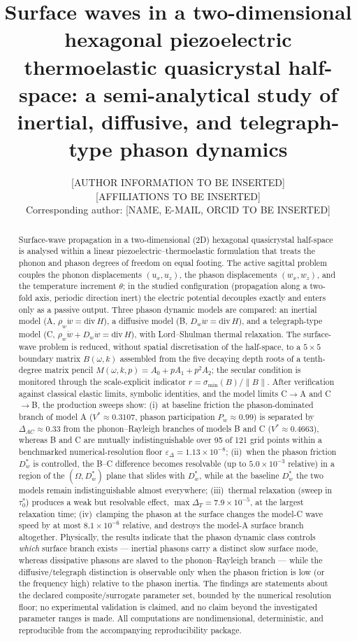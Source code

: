\documentclass[11pt]{article}
\title{\bf Surface waves in a two-dimensional hexagonal piezoelectric thermoelastic quasicrystal half-space: a semi-analytical study of inertial, diffusive, and telegraph-type phason dynamics}
\author{[AUTHOR INFORMATION TO BE INSERTED]\\
\small [AFFILIATIONS TO BE INSERTED]\\
\small Corresponding author: [NAME, E-MAIL, ORCID TO BE INSERTED]}
\date{}
\newcommand{\e}{\varepsilon}
\newcommand{\om}{\omega}
\newcommand{\Om}{\Omega}
\newcommand{\tht}{\theta}
\newcommand{\Dw}{D_w}
\newcommand{\rw}{\rho_w}
\begin{document}
\maketitle

\begin{abstract}
\noindent Surface-wave propagation in a two-dimensional (2D) hexagonal quasicrystal half-space is analysed within a linear piezoelectric--thermoelastic formulation that treats the phonon and phason degrees of freedom on equal footing. The active sagittal problem couples the phonon displacements $(u_x,u_z)$, the phason displacements $(w_x,w_z)$, and the temperature increment $\tht$; in the studied configuration (propagation along a two-fold axis, periodic direction inert) the electric potential decouples exactly and enters only as a passive output. Three phason dynamic models are compared: an inertial model (A, $\rw\ddot w=\mathrm{div}\,H$), a diffusive model (B, $\Dw\dot w=\mathrm{div}\,H$), and a telegraph-type model (C, $\rw\ddot w+\Dw\dot w=\mathrm{div}\,H$), with Lord--Shulman thermal relaxation. The surface-wave problem is reduced, without spatial discretisation of the half-space, to a $5\times5$ boundary matrix $B(\om,k)$ assembled from the five decaying depth roots of a tenth-degree matrix pencil $M(\om,k,p)=A_0+pA_1+p^2A_2$; the secular condition is monitored through the scale-explicit indicator $r=\sigma_{\min}(B)/\lVert B\rVert$. After verification against classical elastic limits, symbolic identities, and the model limits C$\to$A and C$\to$B, the production sweeps show: (i)~at baseline friction the phason-dominated branch of model A ($V^*\approx0.3107$, phason participation $P_w\approx0.99$) is separated by $\Delta_{AC}\approx0.33$ from the phonon--Rayleigh branches of models B and C ($V^*\approx0.4663$), whereas B and C are mutually indistinguishable over 95 of 121 grid points within a benchmarked numerical-resolution floor $\e_\Delta=1.13\times10^{-8}$; (ii)~when the phason friction $D_w^*$ is controlled, the B--C difference becomes resolvable (up to $5.0\times10^{-3}$ relative) in a region of the $(\Om,D_w^*)$ plane that slides with $D_w^*$, while at the baseline $D_w^*$ the two models remain indistinguishable almost everywhere; (iii)~thermal relaxation (sweep in $\tau_0^*$) produces a weak but resolvable effect, $\max\Delta_T=7.9\times10^{-5}$, at the largest relaxation time; (iv)~clamping the phason at the surface changes the model-C wave speed by at most $8.1\times10^{-6}$ relative, and destroys the model-A surface branch altogether. Physically, the results indicate that the phason dynamic class controls \emph{which} surface branch exists --- inertial phasons carry a distinct slow surface mode, whereas dissipative phasons are slaved to the phonon--Rayleigh branch --- while the diffusive/telegraph distinction is observable only when the phason friction is low (or the frequency high) relative to the phason inertia. The findings are statements about the declared composite/surrogate parameter set, bounded by the numerical resolution floor; no experimental validation is claimed, and no claim beyond the investigated parameter ranges is made. All computations are nondimensional, deterministic, and reproducible from the accompanying reproducibility package.


\end{abstract}
\end{document}

